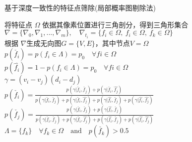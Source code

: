 \begin{algorithm}
    \caption{基于深度一致性的特征点筛除(局部概率图剔除法)}
    将特征点 $\Omega$ 依据其像素位置进行三角剖分，得到三角形集合$\nabla =\{\nabla_0,\nabla_1,...,\nabla_m\},\quad \nabla_{t_i}=\{f_i\in\Omega,\ f_i\in\Omega,\ f_k\in\Omega\}$\\
    根据 $\nabla$生成无向图$G=\{V,E\}$，其中节点$V=\Omega$ \\
    $p(\check{f_i}) = p(f_i\in \Lambda)= p_0 \quad \forall fi \in \Omega $\\
    $p(\hat{f_i}) = 1 -p(f_i\in \Lambda)= p_0 \quad \forall fi \in \Omega $\\   

    {   
        {
            $\gamma= (v_i-v_j)(d_i-d_j)$\\
            $p(\check{f_i}) = \frac{p(\gamma|\check{f_i},\check{f_j})+p(\gamma|\check{f_i},\hat{f_j})}{p(\gamma|\check{f_i},\check{f_j})+p(\gamma|\check{f_i},\hat{f_j})+p(\gamma|\hat{f_i},\check{f_j})+p(\gamma|\hat{f_i},\hat{f_j})}$\\
            $p(\check{f_j}) = \frac{p(\gamma|\check{f_i},\check{f_j})+p(\gamma|\hat{f_i},\check{f_j})}{p(\gamma|\check{f_i},\check{f_j})+p(\gamma|\check{f_i},\hat{f_j})+p(\gamma|\hat{f_i},\check{f_j})+p(\gamma|\hat{f_i},\hat{f_j})}$
        }
    }
    $\Lambda = \{f_k\} \quad \forall f_k \in  \Omega \quad \text{and} \quad  p(\check{f_k})>0.5$
  \label{alg:depth_rejection_3}
\end{algorithm}

